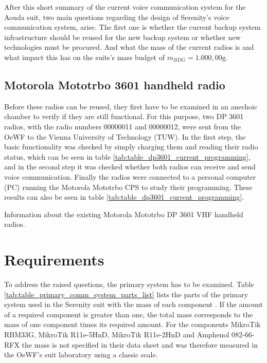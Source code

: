 After this short summary of the current voice communication system for the Aouda suit, two main questions regarding the design of Serenity's voice communication system, arise. The first one is whether the current backup system infrastructure should be reused for the new backup system or whether new technologies must be procured. And what the mass of the current radios is and what impact this has on the suits's mass budget of $m_{BDG} = 1.000,00\mathrm{g}$.

\subsection{Motorola Mototrbo 3601 handheld radio}
Before these radios can be reused, they first have to be examined in an anechoic chamber to verify if they are still functional. For this purpose, two DP 3601 radios, with the radio numbers 00000011 and 00000012, were sent from the OeWF to the Vienna University of Technology (TUW). In the first step, the basic functionality was checked by simply charging them and reading their radio status, which can be seen in table \ref{tab:table_dp3601_current_programming}, and in the second step it was checked whether both radios can receive and send voice communication. Finally the radios were connected to a personal computer (PC) running the Motorola Mototrbo CPS to study their programming. These results can also be seen in table \ref{tab:table_dp3601_current_programming}.

\vfill%
\begin{table}[h!]
	\centering
	
	\caption{Information about the existing Motorola Mototrbo DP 3601 VHF handheld radios.}
	\label{tab:table_dp3601_current_programming}
\end{table}
\vfill%

\section{Requirements}
To address the raised questions, the primary system has to be examined. Table \ref{tab:table_primary_comm_system_parts_list} lists the parts of the primary system used in the Serenity suit with the mass of each component \cite{Laird-antenna:2014, Pulse-Larsen-antennas:2015, Laird-cable:2015}. If the amount of a required component is greater than one, the total mass corresponds to the mass of one component times its required amount. For the components MikroTik RBM33G, MikroTik R11e-5HnD, MikroTik R11e-2HnD and Amphenol 082-66-RFX the mass is not specified in their data sheet and was therefore measured in the OeWF's suit laboratory using a classic scale.

